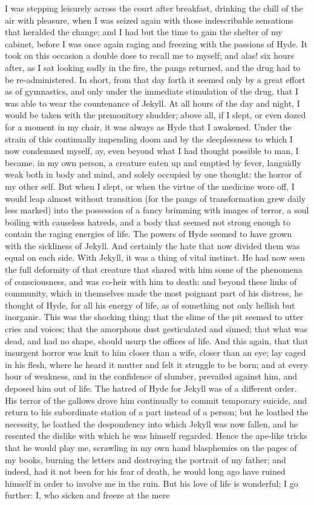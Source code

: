\documentclass[12pt,openright]{book}
\begin{document}
I was stepping leisurely across the court after breakfast, drinking the chill of the air with pleasure, when I was seized again with those indescribable sensations that heralded the change; and I had but the time to gain the shelter of my cabinet, before I was once again raging and freezing with the passions of Hyde. It took on this occasion a double dose to recall me to myself; and alas! six hours after, as I sat looking sadly in the fire, the pangs returned, and the drug had to be re-administered. In short, from that day forth it seemed only by a great effort as of gymnastics, and only under the immediate stimulation of the drug, that I was able to wear the countenance of Jekyll. At all hours of the day and night, I would be taken with the premonitory shudder; above all, if I slept, or even dozed for a moment in my chair, it was always as Hyde that I awakened. Under the strain of this continually impending doom and by the sleeplessness to which I now condemned myself, ay, even beyond what I had thought possible to man, I became, in my own person, a creature eaten up and emptied by fever, languidly weak both in body and mind, and solely occupied by one thought: the horror of my other self. But when I slept, or when the virtue of the medicine wore off, I would leap almost without transition (for the pangs of transformation grew daily less marked) into the possession of a fancy brimming with images of terror, a soul boiling with causeless hatreds, and a body that seemed not strong enough to contain the raging energies of life. The powers of Hyde seemed to have grown with the sickliness of Jekyll. And certainly the hate that now divided them was equal on each side. With Jekyll, it was a thing of vital instinct. He had now seen the full deformity of that creature that shared with him some of the phenomena of consciousness, and was co-heir with him to death: and beyond these links of community, which in themselves made the most poignant part of his distress, he thought of Hyde, for all his energy of life, as of something not only hellish but inorganic. This was the shocking thing; that the slime of the pit seemed to utter cries and voices; that the amorphous dust gesticulated and sinned; that what was dead, and had no shape, should usurp the offices of life. And this again, that that insurgent horror was knit to him closer than a wife, closer than an eye; lay caged in his flesh, where he heard it mutter and felt it struggle to be born; and at every hour of weakness, and in the confidence of slumber, prevailed against him, and deposed him out of life. The hatred of Hyde for Jekyll was of a different order. His terror of the gallows drove him continually to commit temporary suicide, and return to his subordinate station of a part instead of a person; but he loathed the necessity, he loathed the despondency into which Jekyll was now fallen, and he resented the dislike with which he was himself regarded. Hence the ape-like tricks that he would play me, scrawling in my own hand blasphemies on the pages of my books, burning the letters and destroying the portrait of my father; and indeed, had it not been for his fear of death, he would long ago have ruined himself in order to involve me in the ruin. But his love of life is wonderful; I go further: I, who sicken and freeze at the mere 
\end{document}
